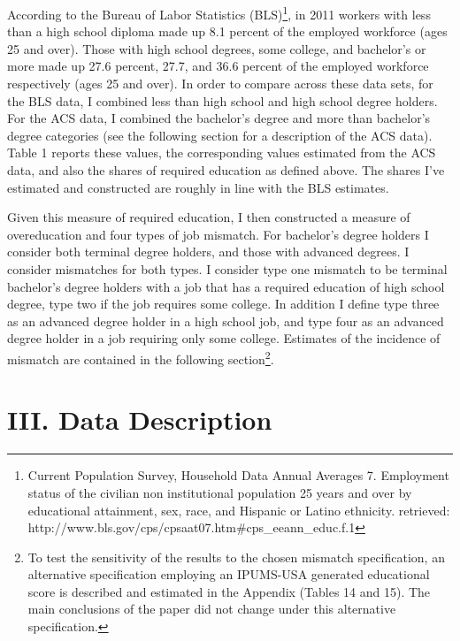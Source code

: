 \documentclass[11pt]{article}
\theoremstyle{definition}
\begin{document}
\vspace{2mm}
According to the Bureau of Labor Statistics (BLS)\footnote{Current Population Survey, Household Data Annual Averages 7. Employment status of the civilian non institutional population 25 years and over by educational attainment, sex, race, and Hispanic or Latino ethnicity. retrieved: http://www.bls.gov/cps/cpsaat07.htm\#cps\_eeann\_educ.f.1}, in 2011 workers with less than a high school diploma made up 8.1 percent of the employed workforce (ages 25 and over).  Those with high school degrees, some college, and bachelor's or more made up 27.6 percent, 27.7, and 36.6 percent of the employed workforce respectively (ages 25 and over).  In order to compare across these data sets, for the BLS data, I combined less than high school and high school degree holders.  For the ACS data, I combined the bachelor's degree and more than bachelor's degree categories (see the following section for a description of the ACS data). Table 1 reports these values, the corresponding values estimated from the ACS data, and also the shares of required education as defined above.  The shares I've estimated and constructed are roughly in line with the BLS estimates.

\vspace{2mm}
\normalsize
\indent
Given this measure of required education, I then constructed a measure of overeducation and four types of job mismatch. For bachelor's degree holders I consider both terminal degree holders, and those with advanced degrees.  I consider mismatches for both types.  I consider type one mismatch to be terminal bachelor's degree holders with a job that has a required education of high school degree, type two if the job requires some college.  In addition I define type three as an advanced degree holder in a high school job, and type four as an advanced degree holder in a job requiring only some college.  Estimates of the incidence of mismatch are contained in the following section\footnote{To test the sensitivity of the results to the chosen mismatch specification, an alternative specification employing an IPUMS-USA generated educational score is described and estimated in the Appendix (Tables 14 and 15).  The main conclusions of the paper did not change under this alternative specification.}.   

\section*{III. Data Description}
\indent
\par
\end{document}
